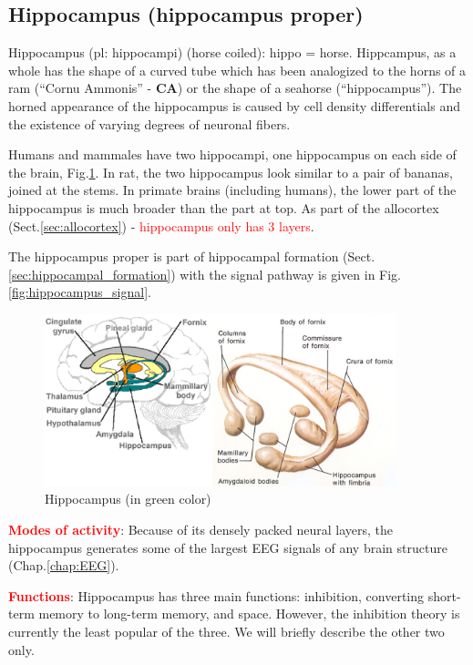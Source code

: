 \subsection{Hippocampus (hippocampus proper)}
\label{sec:hippocampus}

Hippocampus (pl: hippocampi) (horse coiled): hippo = horse.
Hippcampus, as a whole has the shape of a curved tube which has been analogized
to the horns of a ram (``Cornu Ammonis'' - {\bf CA}) or the shape of a seahorse
(``hippocampus''). The horned appearance of the hippocampus is caused by cell
density differentials and the existence of varying degrees of neuronal fibers.

Humans and mammales have two hippocampi, one hippocampus on each side of the
brain, Fig.\ref{fig:hippocampus}. In rat, the two hippocampus look similar to a
pair of bananas, joined at the stems. In primate brains (including humans), the
lower part of the hippocampus is much broader than the part at top.
As part of the allocortex (Sect.\ref{sec:allocortex}) - \textcolor{red}{
hippocampus only has 3 layers}.

The hippocampus proper is part of hippocampal formation
(Sect.\ref{sec:hippocampal_formation}) with the signal pathway is given in
Fig.\ref{fig:hippocampus_signal}.


\begin{figure}[hbt]
  \centerline{\includegraphics[height=5cm,
    angle=0]{./images/hippocampus_01.eps}}
\caption{Hippocampus (in green color)}
\label{fig:hippocampus}
\end{figure}


\textcolor{red}{\bf Modes of activity}:
Because of its densely packed neural layers, the hippocampus generates some of
the largest EEG signals of any brain structure (Chap.\ref{chap:EEG}).


\textcolor{red}{\bf Functions}: Hippocampus has three main functions:
inhibition, converting short-term memory to long-term memory, and space.
However, the inhibition theory is currently the least popular of the three. We
will briefly describe the other two only.

